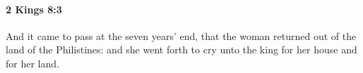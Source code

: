 
		\paragraph{2 Kings 8:3} %
			\label{2KINGS-8-3}

			And it came to pass at the seven years’ end, that the woman returned out of the land of the Philistines: and she went forth to cry unto the king for her house and for her land.


